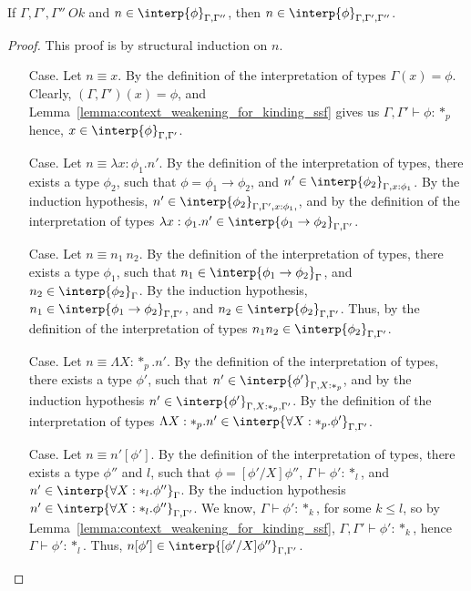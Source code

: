 \begin{lemma}
  If $\Gamma,\Gamma',\Gamma''\ Ok$ and $n \in \interp{\phi}_{\Gamma,\Gamma''}$, then 
  $n \in \interp{\phi}_{\Gamma,\Gamma',\Gamma''}$.
  \label{lemma:context_weakening_interpretations_ssf}
\end{lemma}
\begin{proof}
  This proof is by structural induction on $n$.
\begin{itemize}
\item[Case.]  Let $n \equiv x$.  By the definition of the interpretation of types 
  $\Gamma(x) = \phi$.  Clearly,
  $(\Gamma,\Gamma')(x) = \phi$, and Lemma~\ref{lemma:context_weakening_for_kinding_ssf} gives 
  us $\Gamma,\Gamma' \vdash \phi:*_p$ hence, $x \in \interp{\phi}_{\Gamma,\Gamma'}$.
  
\item[Case.]  Let $n \equiv \lambda x:\phi_1.n'$.  By the definition of the interpretation of 
  types, there exists a type $\phi_2$, such that $\phi = \phi_1 \rightarrow \phi_2$, and 
  $n' \in \interp{\phi_2}_{\Gamma,x:\phi_1}$.  By
  the induction hypothesis, $n' \in \interp{\phi_2}_{\Gamma,\Gamma',x:\phi_1,}$, and by the 
  definition of the interpretation of types 
  $\lambda x:\phi_1.n' \in \interp{\phi_1 \rightarrow \phi_2}_{\Gamma,\Gamma'}$.
  
\item[Case.]  Let $n \equiv n_1\ n_2$.  By the definition of the interpretation of types, there 
  exists a type $\phi_1$, such that 
  $n_1 \in \interp{\phi_1 \rightarrow \phi_2}_\Gamma$, and $n_2 \in \interp{\phi_2}_\Gamma$.  By 
  the induction hypothesis,
  $n_1 \in \interp{\phi_1 \rightarrow \phi_2}_{\Gamma,\Gamma'}$, and 
  $n_2 \in \interp{\phi_2}_{\Gamma,\Gamma'}$.  Thus, by
  the definition of the interpretation of types $n_1n_2 \in \interp{\phi_2}_{\Gamma,\Gamma'}$.
  
\item[Case.]  Let $n \equiv \Lambda X:*_p.n'$.  By the definition of the interpretation of 
  types, there exists a type $\phi'$, such that
  $n' \in \interp{\phi'}_{\Gamma,X:*_p}$, and by the induction hypothesis 
  $n' \in \interp{\phi'}_{\Gamma,X:*_p,\Gamma'}$.  By the
  definition of the interpretation of types 
  $\Lambda X:*_p.n' \in \interp{\forall X:*_p.\phi'}_{\Gamma,\Gamma'}$.
  
\item[Case.]  Let $n \equiv n'[\phi']$.  By the definition of the interpretation of types, 
  there exists a type $\phi''$ and $l$, 
  such that $\phi = [\phi'/X]\phi''$, $\Gamma \vdash \phi':*_l$, and 
  $n' \in \interp{\forall X:*_l.\phi''}_{\Gamma}$.  By the induction
  hypothesis $n' \in \interp{\forall X:*_l.\phi''}_{\Gamma,\Gamma'}$.  We know, 
  $\Gamma \vdash \phi':*_k$, for some $k \leq l$, so by
  Lemma~\ref{lemma:context_weakening_for_kinding_ssf}, $\Gamma,\Gamma' \vdash \phi':*_k$, 
  hence 
  $\Gamma \vdash \phi':*_l$. Thus, $n[\phi'] \in
  \interp{[\phi'/X]\phi''}_{\Gamma,\Gamma'}$.
\end{itemize}
\end{proof}
